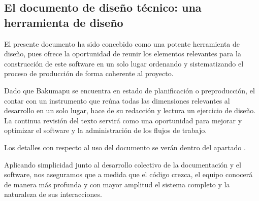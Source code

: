 \subsection{El documento de diseño técnico: una herramienta de diseño}\label{principios:documento-tecnico-como-herramienta}
El presente documento ha sido concebido como una potente herramienta de diseño, pues ofrece la oportunidad de reunir los elementos relevantes para la construcción de este software en un solo lugar ordenando y sistematizando el proceso de producción de forma coherente al proyecto.

Dado que Bakumapu se encuentra en estado de planificación o preproducción, el contar con un instrumento que reúna todas las dimensiones relevantes al desarrollo en un solo lugar, hace de su redacción y lectura un ejercicio de diseño. La continua revisión del texto servirá como una oportunidad para mejorar y optimizar el software y la administración de los flujos de trabajo.

Los detalles con respecto al uso del documento se verán dentro del apartado .

Aplicando simplicidad junto al desarrollo colectivo de la documentación y el software, nos aseguramos que a medida que el código crezca, el equipo conocerá de manera más profunda y con mayor amplitud el sistema completo y la naturaleza de sus interacciones.
